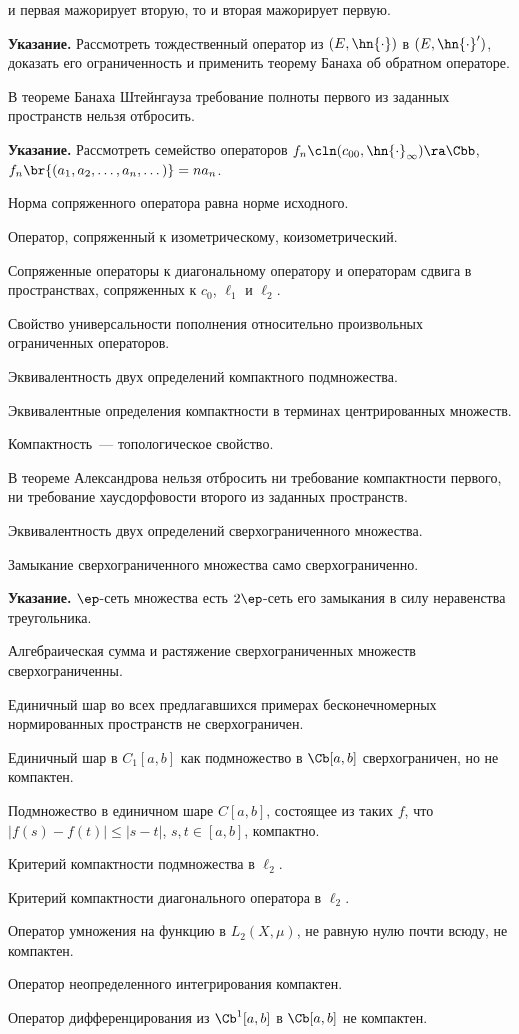 \documentclass[a4paper]{article}
\def\apoint{\par\textbf{Указание.} }
\begin{document}
\begin{nums}{-1}
и первая мажорирует вторую, то и вторая мажорирует первую. \apoint Рассмотреть тождественный
оператор из $(E,\hn{\cdot})$ в $(E,\hn{\cdot}')$, доказать его ограниченность и применить теорему
Банаха об обратном операторе.
\item В теореме Банаха Штейнгауза требование полноты первого из заданных пространств нельзя отбросить.
\apoint Рассмотреть семейство операторов $f_n\cln(c_{00},\hn{\cdot}_\infty)\ra\Cbb$,
$f_n\br{(a_1,a_2,\dots,a_n,\dots)}=na_n$.
\item Норма сопряженного оператора равна норме исходного.
\item Оператор, сопряженный к изометрическому, коизометрический.
\item Сопряженные операторы к диагональному оператору и операторам сдвига в пространствах, сопряженных
к $c_0$, $\ell_1$ и $\ell_2$.
\item Свойство универсальности пополнения относительно произвольных ограниченных операторов.
\item Эквивалентность двух определений компактного подмножества.
\item Эквивалентные определения компактности в терминах центрированных множеств.
\item Компактность~--- топологическое свойство.
\item В теореме Александрова нельзя отбросить ни требование компактности
первого, ни требование хаусдорфовости второго из заданных пространств.
\item Эквивалентность двух определений сверхограниченного множества.
\item Замыкание сверхограниченного множества само сверхограниченно.
\apoint $\ep$-сеть множества есть $2\ep$-сеть его замыкания в силу неравенства треугольника.
\item Алгебраическая сумма и растяжение сверхограниченных множеств сверхограниченны.
\item Единичный шар во всех предлагавшихся примерах бесконечномерных нормированных пространств
не сверх\-ограничен.
\item Единичный шар в $C_1[a,b]$ как подмножество в $\Cb[a,b]$ сверхограничен, но не компактен.
\item Подмножество в единичном шаре $C[a,b]$, состоящее из таких $f$, что
$|f(s)-f(t)|\leqslant|s-t|$, $s,t\in[a,b]$, компактно.
\item Критерий компактности подмножества в $\ell_2$.
\item Критерий компактности диагонального оператора в $\ell_2$.
\item Оператор умножения на функцию в $L_2(X,\mu)$, не равную нулю почти всюду, не компактен.
\item Оператор неопределенного интегрирования компактен.
\item Оператор дифференцирования из $\Cb^1[a,b]$ в $\Cb[a,b]$ не компактен.
\end{nums}
\end{document}
